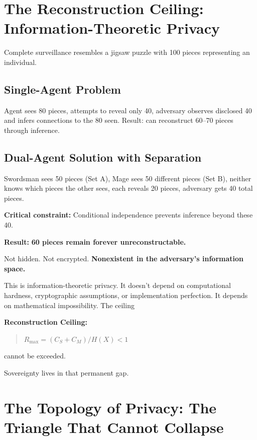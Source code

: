 \documentclass[11pt,a4paper]{article}
\theoremstyle{definition}
\begin{document}
\section{The Reconstruction Ceiling: Information-Theoretic Privacy}

Complete surveillance resembles a jigsaw puzzle with 100 pieces representing an individual.

\subsection{Single-Agent Problem}

Agent sees 80 pieces, attempts to reveal only 40, adversary observes disclosed 40 and infers connections to the 80 seen. Result: can reconstruct 60--70 pieces through inference.

\subsection{Dual-Agent Solution with Separation}

Swordsman sees 50 pieces (Set A), Mage sees 50 different pieces (Set B), neither knows which pieces the other sees, each reveals 20 pieces, adversary gets 40 total pieces.

\textbf{Critical constraint:} Conditional independence prevents inference beyond these 40.

\textbf{Result:} \textbf{60 pieces remain forever unreconstructable.}

Not hidden. Not encrypted. \textbf{Nonexistent in the adversary's information space.}

This is information-theoretic privacy. It doesn't depend on computational hardness, cryptographic assumptions, or implementation perfection. It depends on mathematical impossibility. The ceiling

\textbf{Reconstruction Ceiling:}

\begin{quote}
\textbf{$R_{\max} = (C_S + C_M) / H(X) < 1$}
\end{quote}

cannot be exceeded.

Sovereignty lives in that permanent gap.

\section{The Topology of Privacy: The Triangle That Cannot Collapse}
\end{document}
